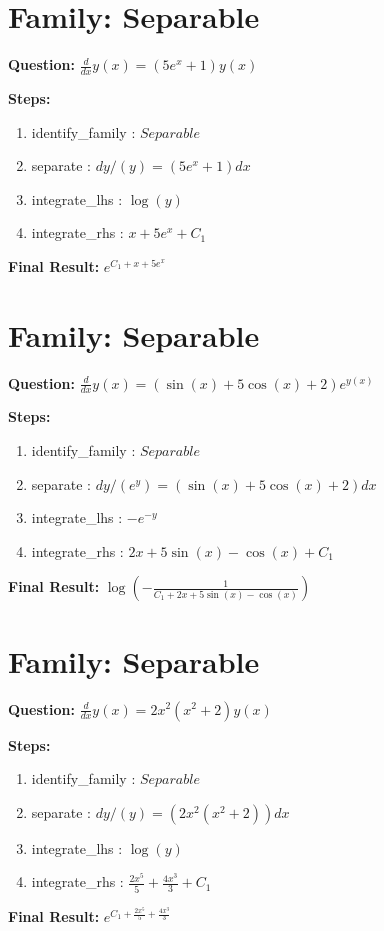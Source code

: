 \documentclass{article}
\begin{document}
\section*{Family: Separable}
\textbf{Question:} $\frac{d}{d x} y{\left(x \right)} = \left(5 e^{x} + 1\right) y{\left(x \right)}$

\textbf{Steps:}
\begin{enumerate}
\item identify_family :  $Separable$
\item separate :  $dy / (y) = (5 e^{x} + 1) dx$
\item integrate_lhs :  $\log{\left(y \right)}$
\item integrate_rhs :  $x + 5 e^{x} + C_1$
\end{enumerate}
\textbf{Final Result:} $e^{C_{1} + x + 5 e^{x}}$

\section*{Family: Separable}
\textbf{Question:} $\frac{d}{d x} y{\left(x \right)} = \left(\sin{\left(x \right)} + 5 \cos{\left(x \right)} + 2\right) e^{y{\left(x \right)}}$

\textbf{Steps:}
\begin{enumerate}
\item identify_family :  $Separable$
\item separate :  $dy / (e^{y}) = (\sin{\left(x \right)} + 5 \cos{\left(x \right)} + 2) dx$
\item integrate_lhs :  $- e^{- y}$
\item integrate_rhs :  $2 x + 5 \sin{\left(x \right)} - \cos{\left(x \right)} + C_1$
\end{enumerate}
\textbf{Final Result:} $\log{\left(- \frac{1}{C_{1} + 2 x + 5 \sin{\left(x \right)} - \cos{\left(x \right)}} \right)}$

\section*{Family: Separable}
\textbf{Question:} $\frac{d}{d x} y{\left(x \right)} = 2 x^{2} \left(x^{2} + 2\right) y{\left(x \right)}$

\textbf{Steps:}
\begin{enumerate}
\item identify_family :  $Separable$
\item separate :  $dy / (y) = (2 x^{2} \left(x^{2} + 2\right)) dx$
\item integrate_lhs :  $\log{\left(y \right)}$
\item integrate_rhs :  $\frac{2 x^{5}}{5} + \frac{4 x^{3}}{3} + C_1$
\end{enumerate}
\textbf{Final Result:} $e^{C_{1} + \frac{2 x^{5}}{5} + \frac{4 x^{3}}{3}}$
\end{document}

